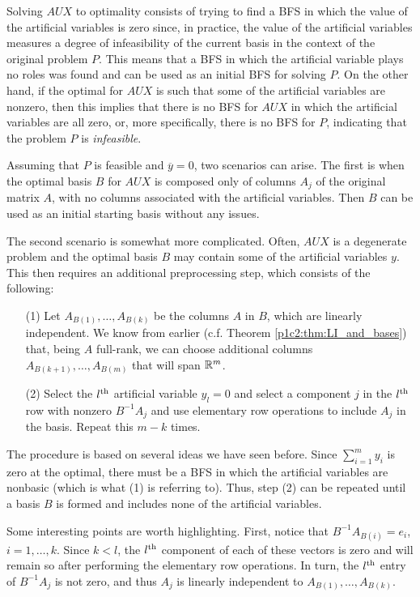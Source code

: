 Solving $AUX$ to optimality consists of trying to find a BFS in which the value of the artificial variables is zero since, in practice, the value of the artificial variables measures a degree of infeasibility of the current basis in the context of the original problem $P$. This means that a BFS in which the artificial variable plays no roles was found and can be used as an initial BFS for solving $P$. On the other hand, if the optimal for $AUX$ is such that some of the artificial variables are nonzero, then this implies that there is no BFS for $AUX$ in which the artificial variables are all zero, or, more specifically, there is no BFS for $P$, indicating that the problem $P$ is \emph{infeasible}.

Assuming that $P$ is feasible and $\overline{y}=0$, two scenarios can arise. The first is when the optimal basis $B$ for $AUX$ is composed only of columns $A_j$ of the original matrix $A$, with no columns associated with the artificial variables. Then $B$ can be used as an initial starting basis without any issues.

The second scenario is somewhat more complicated. Often, $AUX$ is a degenerate problem and the optimal basis $B$ may contain some of the artificial variables $y$. This then requires an additional preprocessing step, which consists of the following:
%
\begin{enumerate}
	\item[(1)] Let $A_{B(1)}, \dots, A_{B(k)}$ be the columns $A$ in $B$, which are linearly independent. We know from earlier (c.f. Theorem \ref{p1c2:thm:LI_and_bases}) that, being $A$ full-rank, we can choose additional columns $A_{B(k+1)}, \dots, A_{B(m)}$ that will span $\mathbb{R}^{m}$.
	\item[(2)] Select the $l^\text{th}$ artificial variable $y_l = 0$ and select a component $j$ in the $l^\text{th}$ row with nonzero $B^{-1}A_j$ and use elementary row operations to include $A_j$ in the basis. Repeat this $m-k$ times.
\end{enumerate}

The procedure is based on several ideas we have seen before. Since $\sum_{i=1}^m y_i$ is zero at the optimal, there must be a BFS in which the artificial variables are nonbasic (which is what (1) is referring to). Thus, step (2) can be repeated until a basis $B$ is formed and includes none of the artificial variables. 

Some interesting points are worth highlighting. First, notice that $B^{-1}A_{B(i)} = e_i$, $i=1, \dots, k$. Since $k < l$, the $l^\text{th}$ component of each of these vectors is zero and will remain so after performing the elementary row operations. In turn, the $l^\text{th}$ entry of $B^{-1}A_j$ is not zero, and thus $A_j$ is linearly independent to $A_{B(1)}, \dots, A_{B(k)}$. 


